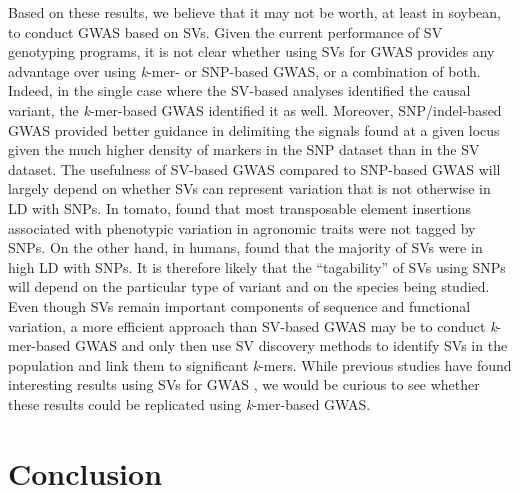 Based on these results, we believe that it may not be worth, at least in
soybean, to conduct GWAS based on SVs. Given the current performance of SV
genotyping programs, it is not clear whether using SVs for GWAS provides any
advantage over using \emph{k}-mer- or SNP-based GWAS, or a combination of both.
Indeed, in the single case where the SV-based analyses identified the causal
variant, the \emph{k}-mer-based GWAS identified it as well. Moreover,
SNP/indel-based GWAS provided better guidance in delimiting the signals found
at a given locus given the much higher density of markers in the SNP dataset
than in the SV dataset. The usefulness of SV-based GWAS compared to SNP-based
GWAS will largely depend on whether SVs can represent variation that is not
otherwise in LD with SNPs. In tomato, \cite{dominguez2020} found that most
transposable element insertions associated with phenotypic variation in
agronomic traits were not tagged by SNPs. On the other hand, in humans,
\cite{maretty2017} found that the majority of SVs were in high LD with SNPs. It
is therefore likely that the ``tagability'' of SVs using SNPs will depend on
the particular type of variant and on the species being studied. Even though
SVs remain important components of sequence and functional variation, a more
efficient approach than SV-based GWAS may be to conduct \emph{k}-mer-based GWAS
and only then use SV discovery methods to identify SVs in the population and
link them to significant \emph{k}-mers. While previous studies have found
interesting results using SVs for GWAS \citep[e.g.][]{zhang2015, akakpo2020,
dominguez2020}, we would be curious to see whether these results
could be replicated using \emph{k}-mer-based GWAS.

\section*{Conclusion}

